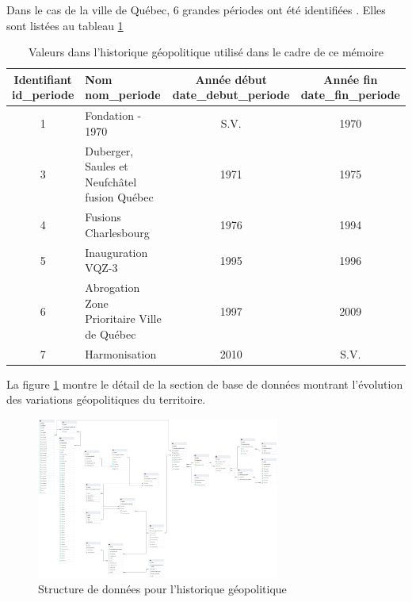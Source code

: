     \FloatBarrier
    Dans le cas de la ville de Québec, 6 grandes périodes ont été identifiées \parencite{ville_de_quebec_reperes_nodate,elections_quebec_atlas_2021}. Elles sont listées au tableau \ref{tab:histo_geopol}
    \begin{table}
    \centering
    \begin{tabular}{c p{5cm} c c}
    \hline
    \makecell{Identifiant\\ id\_periode} & \makecell[l]{Nom \\ nom\_periode} & \makecell{Année début \\ date\_debut\_periode} & \makecell{Année fin \\ date\_fin\_periode}\\ \hline
    1 & Fondation - 1970 &  S.V. & 1970 \\
    3 & Duberger, Saules et Neufchâtel fusion Québec & 1971 & 1975 \\
    4 & Fusions Charlesbourg & 1976 & 1994 \\
    5 & Inauguration VQZ-3 & 1995 & 1996 \\
    6 & Abrogation Zone Prioritaire Ville de Québec & 1997 & 2009 \\
    7 & Harmonisation & 2010 & S.V.\\ \hline
    \end{tabular}
    \caption{Valeurs dans l'historique géopolitique utilisé dans le cadre de ce mémoire}\label{tab:histo_geopol}
    \end{table}
    \FloatBarrier
    La figure \ref{fig:offstreet_db_erd_history} montre le détail de la section de base de données montrant l'évolution des variations géopolitiques du territoire.\par
    \begin{figure}
        \centering
        \includegraphics[trim={18cm 40cm 60cm 12cm}, clip, width=8cm]{images/structure_base_de_donnee.png}
        \caption{Structure de données pour l'historique géopolitique}\label{fig:offstreet_db_erd_history}
    \end{figure}
    \FloatBarrier
    
